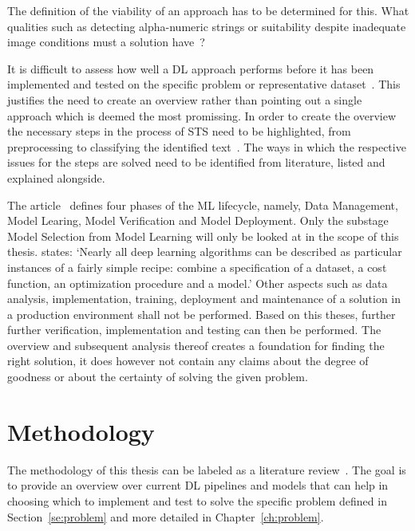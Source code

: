 The definition of the viability of an approach has to be determined for this.
What qualities such as detecting alpha-numeric strings or suitability despite
inadequate image conditions must a solution have~\citep{ghosh_visual_2017, hu_gtc_2020}?

It is difficult to assess how well a \ac{DL} approach performs before it has been
implemented and tested on the specific problem or representative dataset~\citep{arpteg_software_2018}.
This justifies the need to create an overview rather than pointing out a single approach which is
deemed the most promissing.
In order to create the overview the necessary steps in the process of \ac{STS} need to be highlighted,
from preprocessing to classifying the identified text~\citep{long_scene_2021, sourvanos_challenges_2018}.
The ways in which the respective issues for the steps are solved need to be
identified from literature, listed and explained alongside.

The article~\cite{ashmore_assuring_2021} defines four phases of the \ac{ML} lifecycle, namely,
Data Management, Model Learing, Model Verification and Model Deployment.
Only the substage Model Selection from Model Learning will only be looked at in the scope of this
thesis.
\cite{goodfellow_deep_2016} states:
`Nearly all deep learning algorithms can be described as particular instances of a fairly simple
recipe: combine a specification of a dataset, a cost function, an optimization procedure and a model.'
Other aspects such as data analysis, implementation, training, deployment and maintenance of a
solution in a production environment shall not be performed.
Based on this theses, further further verification, implementation and testing can then be performed.
The overview and subsequent analysis thereof creates a foundation for finding the right solution,
it does however not contain any claims about the degree of goodness or about the certainty of
solving the given problem.

\begin{comment}
Abgrenzung für Training NN
- no talk about Setup (preprocessing, weight initialization,regularization)
- No talk about training dynamics (learning rate,large batch training, hyperparameter)
- No after training ( transfer learning, model ensemble)
\end{comment}

\section{Methodology}\label{se:methodology}
The methodology of this thesis can be labeled as a literature review~\citep{snyder_literature_2019,
torraco_writing_2005}.
The goal is to provide an overview over current \ac{DL} pipelines and models that can help in
choosing which to implement and test to solve the specific problem defined in
Section~\ref{se:problem} and more detailed in Chapter~\ref{ch:problem}.

